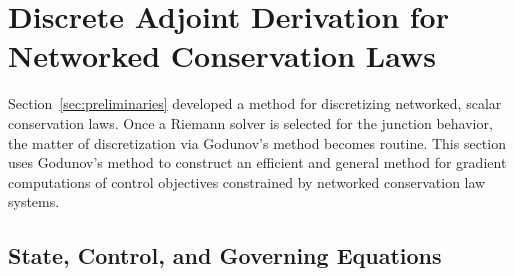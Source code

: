 

\section{Discrete Adjoint Derivation for Networked Conservation Laws}

Section~\ref{sec:preliminaries} developed a method for discretizing networked, scalar conservation laws. Once a Riemann solver is selected for the junction behavior, the matter of discretization via Godunov's method becomes routine. This section uses Godunov's method to construct an efficient and general method for gradient computations of control objectives constrained by networked conservation law systems.

\subsection{State, Control, and Governing Equations\label{sec:State,-control,-and}}

